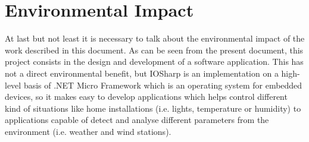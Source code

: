 \section{Environmental Impact}\label{S:Environmental-Impact}
At last but not least it is necessary to talk about the environmental impact of the work described in this document. As can be seen from the present document, this project consists in the design and development of a software application. This has not a direct environmental benefit, but IOSharp is an implementation on a high-level basis of .NET Micro Framework which is an operating system for embedded devices, so it makes easy to develop applications which helps control different kind of situations like home installations (i.e. lights, temperature or humidity) to applications capable of detect and analyse different parameters from the environment (i.e. weather and wind stations).